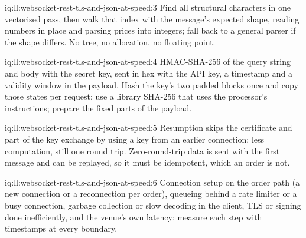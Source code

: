 \begin{solution}{iq:ll:websocket-rest-tls-and-json-at-speed:3}
Find all structural characters in one vectorised pass, then walk that index with the message's expected shape, reading
numbers in place and parsing prices into integers; fall back to a general parser if the shape differs. No tree, no allocation,
no floating point.
\end{solution}

\begin{solution}{iq:ll:websocket-rest-tls-and-json-at-speed:4}
HMAC-SHA-256 of the query string and body with the secret key, sent in hex with the API key, a timestamp and a validity window
in the payload. Hash the key's two padded blocks once and copy those states per request; use a library SHA-256 that uses the
processor's instructions; prepare the fixed parts of the payload.
\end{solution}

\begin{solution}{iq:ll:websocket-rest-tls-and-json-at-speed:5}
Resumption skips the certificate and part of the key exchange by using a key from an earlier connection: less computation,
still one round trip. Zero-round-trip data is sent with the first message and can be replayed, so it must be idempotent,
which an order is not.
\end{solution}

\begin{solution}{iq:ll:websocket-rest-tls-and-json-at-speed:6}
Connection setup on the order path (a new connection or a reconnection per order), queueing behind a rate limiter or a busy
connection, garbage collection or slow decoding in the client, TLS or signing done inefficiently, and the venue's own latency;
measure each step with timestamps at every boundary.
\end{solution}
